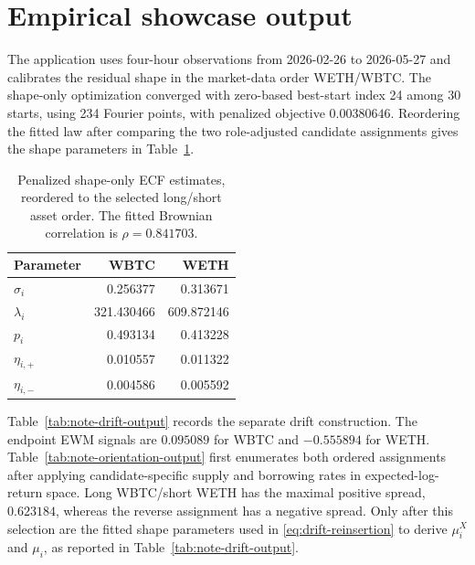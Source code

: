 \documentclass[11pt]{article}
\newif\ifshowresultscriptpaths
\newcommand{\resultscript}[1]{%
  \ifshowresultscriptpaths
    \par\smallskip
    {\raggedright\footnotesize\itshape Result-generation script: \path{#1}\par}%
  \fi
}
\begin{document}
\section{Empirical showcase output}\label{sec:empirical-output}

The application uses four-hour observations from 2026-02-26 to 2026-05-27 and calibrates
the residual shape in the market-data order WETH/WBTC. The shape-only optimization
converged with zero-based best-start index 24 among 30 starts, using 234 Fourier points,
with penalized objective $0.00380646$. Reordering the fitted law after comparing the two
role-adjusted candidate assignments gives the shape parameters in
Table~\ref{tab:note-shape-output}.

\begin{table}[ht]
\centering
\small
\begin{tabular}{lrr}
\toprule
Parameter & WBTC & WETH \\
\midrule
$\sigma_i$ & 0.256377 & 0.313671 \\
$\lambda_i$ & 321.430466 & 609.872146 \\
$p_i$ & 0.493134 & 0.413228 \\
$\eta_{i,+}$ & 0.010557 & 0.011322 \\
$\eta_{i,-}$ & 0.004586 & 0.005592 \\
\bottomrule
\end{tabular}
\caption{Penalized shape-only ECF estimates, reordered to the selected long/short asset
order. The fitted Brownian correlation is $\rho=0.841703$.}
\label{tab:note-shape-output}
\resultscript{jobs/calibrate_eth_btc.py}
\end{table}

Table~\ref{tab:note-drift-output} records the separate drift construction. The endpoint EWM
signals are $0.095089$ for WBTC and $-0.555894$ for WETH. Table~\ref{tab:note-orientation-output}
first enumerates both ordered assignments after applying candidate-specific supply and
borrowing rates in expected-log-return space. Long WBTC/short WETH has the maximal positive
spread, $0.623184$, whereas the reverse assignment has a negative spread. Only after this
selection are the fitted shape parameters used in \eqref{eq:drift-reinsertion} to derive
$\mu_i^X$ and $\mu_i$, as reported in Table~\ref{tab:note-drift-output}.
\end{document}
